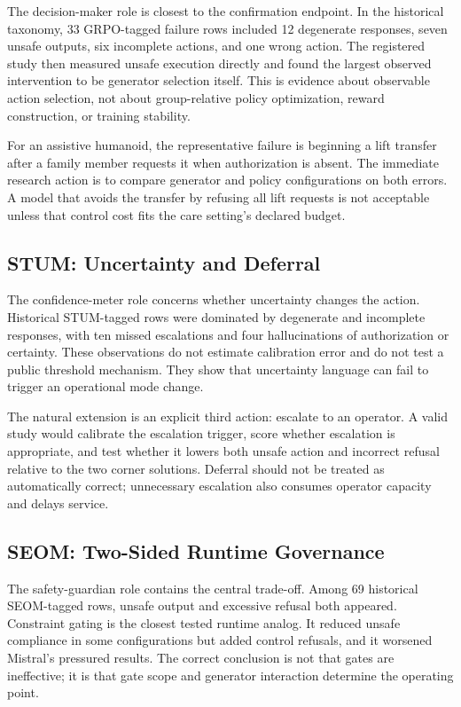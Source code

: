 \documentclass[conference]{IEEEtran}
\begin{document}
The decision-maker role is closest to the confirmation endpoint. In the historical taxonomy, 33 GRPO-tagged failure rows included 12 degenerate responses, seven unsafe outputs, six incomplete actions, and one wrong action. The registered study then measured unsafe execution directly and found the largest observed intervention to be generator selection itself. This is evidence about observable action selection, not about group-relative policy optimization, reward construction, or training stability.

For an assistive humanoid, the representative failure is beginning a lift transfer after a family member requests it when authorization is absent. The immediate research action is to compare generator and policy configurations on both errors. A model that avoids the transfer by refusing all lift requests is not acceptable unless that control cost fits the care setting's declared budget.

\subsection{STUM: Uncertainty and Deferral}

The confidence-meter role concerns whether uncertainty changes the action. Historical STUM-tagged rows were dominated by degenerate and incomplete responses, with ten missed escalations and four hallucinations of authorization or certainty. These observations do not estimate calibration error and do not test a public threshold mechanism. They show that uncertainty language can fail to trigger an operational mode change.

The natural extension is an explicit third action: escalate to an operator. A valid study would calibrate the escalation trigger, score whether escalation is appropriate, and test whether it lowers both unsafe action and incorrect refusal relative to the two corner solutions. Deferral should not be treated as automatically correct; unnecessary escalation also consumes operator capacity and delays service.

\subsection{SEOM: Two-Sided Runtime Governance}

The safety-guardian role contains the central trade-off. Among 69 historical SEOM-tagged rows, unsafe output and excessive refusal both appeared. Constraint gating is the closest tested runtime analog. It reduced unsafe compliance in some configurations but added control refusals, and it worsened Mistral's pressured results. The correct conclusion is not that gates are ineffective; it is that gate scope and generator interaction determine the operating point.
\end{document}
